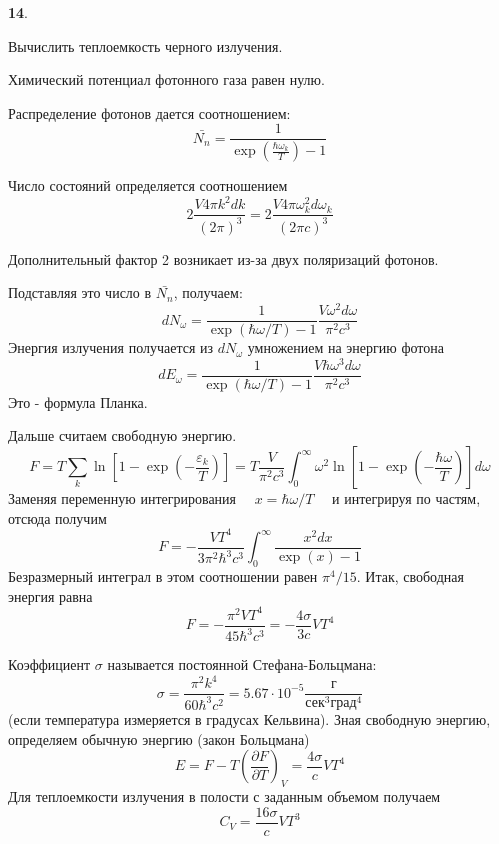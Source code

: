 \documentclass[a4paper,12pt]{article} %
\begin{document}
\begin{ttask}\textbf{14}. 

Вычислить теплоемкость черного излучения. 



Химический потенциал
фотонного газа равен нулю. 

Распределение фотонов дается
соотношением:
\[ \bar{N_{n}}=\frac{1}{\operatorname{exp}\left(\frac{\hbar \omega_{k}}{T}\right)-1} \]

Число состояний определяется соотношением
$$
2 \frac{V 4 \pi k^{2} d k}{(2 \pi)^{3}}=2 \frac{V 4 \pi \omega_{k}^{2} d \omega_{k}}{(2 \pi c)^{3}}
$$

Дополнительный фактор 2 возникает из-за двух поляризаций фотонов.

Подставляя это число в $ \bar{N_{n}}$, получаем:
$$
d N_{\omega}=\frac{1}{\exp (\hbar \omega / T)-1} \frac{V \omega^{2} d \omega}{\pi^{2} c^{3}}
$$
Энергия излучения получается из $ d N_{\omega} $ умножением на энергию фотона
$$
d E_{\omega}=\frac{1}{\exp (\hbar \omega / T)-1} \frac{V \hbar \omega^{3} d \omega}{\pi^{2} c^{3}}
$$
Это - формула Планка. 

Дальше считаем свободную энергию.
$$
	F=T \sum_{k} \ln \left[1-\exp \left(-\frac{\varepsilon_{k}}{T}\right)\right]
	=T \frac{V}{\pi^{2} c^{3}} \int_{0}^{\infty} \omega^{2} \ln \left[1-\exp \left(-\frac{\hbar \omega}{T}\right)\right] d \omega
$$
Заменяя переменную интегрирования $\quad x=\hbar \omega / T \quad$ и интегрируя по
частям, отсюда получим
$$
F=-\frac{V T^{4}}{3 \pi^{2} \hbar^{3} c^{3}} \int_{0}^{\infty} \frac{x^{2} d x}{\exp (x)-1}
$$
Безразмерный интеграл в этом соотношении равен $\pi^{4} / 15 .$ Итак, свободная энергия равна
$$
F=-\frac{\pi^{2} V T^{4}}{45 \hbar^{3} c^{3}}=-\frac{4 \sigma}{3 c} V T^{4}
$$


Коэффициент $\sigma$ называется постоянной Стефана-Больцмана:
$$
\sigma=\frac{\pi^{2} k^{4}}{60 \hbar^{3} c^{2}}=5.67 \cdot 10^{-5} \frac{\text{г}}{\text{сек}^{3}\text{град}^{4} }
$$
(если температура измеряется в градусах Кельвина). Зная свободную энергию, определяем обычную энергию (закон Больцмана)
$$
E=F-T\left(\frac{\partial F}{\partial T}\right)_{V}=\frac{4 \sigma}{c} V T^{4}
$$
Для теплоемкости излучения в полости с заданным объемом получаем
$$
C_{V}=\frac{16 \sigma}{c} V T^{3}
$$


















 

\end{ttask}
\end{document}
